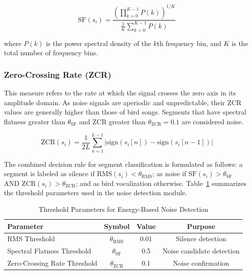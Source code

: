 \documentclass[conference]{IEEEtran}
\begin{document}
\begin{equation}
\mathrm{SF}(s_i) = \frac{\left(\prod_{k=0}^{K-1} P(k)\right)^{1/K}}{\frac{1}{K} \sum_{k=0}^{K-1} P(k)}
\end{equation}

\noindent where $P(k)$ is the power spectral density of the $k$th frequency bin, and $K$ is the total number of frequency bins.

\subsubsection{Zero-Crossing Rate (ZCR)}
This measure refers to the rate at which the signal crosses the zero axis in its amplitude domain. As noise signals are aperiodic and unpredictable, their ZCR values are generally higher than those of bird songs. Segments that have spectral flatness greater than $\theta_{\mathrm{SF}}$ and ZCR greater than $\theta_{\mathrm{ZCR}} = 0.1$ are considered noise.

\begin{equation}
\mathrm{ZCR}(s_i) = \frac{1}{2L} \sum_{n=1}^{L-1} \left| \mathrm{sign}(s_i[n]) - \mathrm{sign}(s_i[n-1]) \right|
\end{equation}

The combined decision rule for segment classification is formulated as follows: a segment is labeled as silence if $\mathrm{RMS}(s_i) < \theta_{\mathrm{RMS}}$; as noise if $\mathrm{SF}(s_i) > \theta_{\mathrm{SF}}$ AND $\mathrm{ZCR}(s_i) > \theta_{\mathrm{ZCR}}$; and as bird vocalization otherwise. Table~\ref{tab:thresholds} summarizes the threshold parameters used in the noise detection module.

\begin{table}[htbp]
\caption{Threshold Parameters for Energy-Based Noise Detection}
\label{tab:thresholds}
\centering
\begin{tabular}{lccc}
\toprule
\textbf{Parameter} & \textbf{Symbol} & \textbf{Value} & \textbf{Purpose} \\
\midrule
RMS Threshold & $\theta_{\mathrm{RMS}}$ & 0.01 & Silence detection \\
Spectral Flatness Threshold & $\theta_{\mathrm{SF}}$ & 0.5 & Noise candidate detection \\
Zero-Crossing Rate Threshold & $\theta_{\mathrm{ZCR}}$ & 0.1 & Noise confirmation \\
\bottomrule
\end{tabular}
\end{table}
\end{document}

